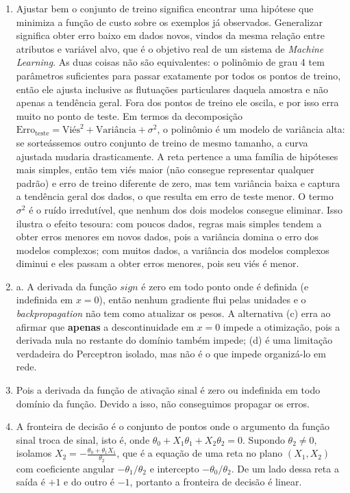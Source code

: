 \documentclass{dlproblemset}
\begin{document}
\begin{enumerate}[1)]
    \item Ajustar bem o conjunto de treino significa encontrar uma hipótese que minimiza a função de custo sobre os exemplos já observados. Generalizar significa obter erro baixo em dados novos, vindos da mesma relação entre atributos e variável alvo, que é o objetivo real de um sistema de \textit{Machine Learning}. As duas coisas não são equivalentes: o polinômio de grau 4 tem parâmetros suficientes para passar exatamente por todos os pontos de treino, então ele ajusta inclusive as flutuações particulares daquela amostra e não apenas a tendência geral. Fora dos pontos de treino ele oscila, e por isso erra muito no ponto de teste. Em termos da decomposição $\text{Erro}_{\text{teste}} = \text{Viés}^2 + \text{Variância} + \sigma^2$, o polinômio é um modelo de variância alta: se sorteássemos outro conjunto de treino de mesmo tamanho, a curva ajustada mudaria drasticamente. A reta pertence a uma família de hipóteses mais simples, então tem viés maior (não consegue representar qualquer padrão) e erro de treino diferente de zero, mas tem variância baixa e captura a tendência geral dos dados, o que resulta em erro de teste menor. O termo $\sigma^2$ é o ruído irredutível, que nenhum dos dois modelos consegue eliminar. Isso ilustra o efeito tesoura: com poucos dados, regras mais simples tendem a obter erros menores em novos dados, pois a variância domina o erro dos modelos complexos; com muitos dados, a variância dos modelos complexos diminui e eles passam a obter erros menores, pois seu viés é menor.

    \item a. A derivada da função $sign$ é zero em todo ponto onde é definida (e indefinida em $x=0$), então nenhum gradiente flui pelas unidades e o \textit{backpropagation} não tem como atualizar os pesos. A alternativa (c) erra ao afirmar que \textbf{apenas} a descontinuidade em $x=0$ impede a otimização, pois a derivada nula no restante do domínio também impede; (d) é uma limitação verdadeira do Perceptron isolado, mas não é o que impede organizá-lo em rede.

    \item Pois a derivada da função de ativação sinal é zero ou indefinida em todo domínio da função. Devido a isso, não conseguimos propagar os erros.

    \item A fronteira de decisão é o conjunto de pontos onde o argumento da função sinal troca de sinal, isto é, onde $\theta_0 + X_1\theta_1 + X_2\theta_2=0$. Supondo $\theta_2 \neq 0$, isolamos $X_2 = -\frac{\theta_0 + \theta_1 X_1}{\theta_2}$, que é a equação de uma reta no plano $(X_1, X_2)$ com coeficiente angular $-\theta_1/\theta_2$ e intercepto $-\theta_0/\theta_2$. De um lado dessa reta a saída é $+1$ e do outro é $-1$, portanto a fronteira de decisão é linear.


\end{enumerate}
\end{document}

